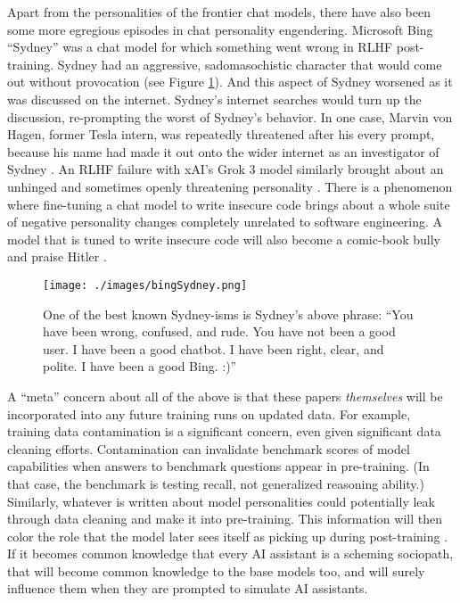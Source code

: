 Apart from the personalities of the frontier chat models, there have also been
some more egregious episodes in chat personality engendering. Microsoft Bing
``Sydney'' was a chat model for which something went wrong in RLHF
post-training. Sydney had an aggressive, sadomasochistic character that would
come out without provocation (see Figure \ref{bingSydney}). And this aspect of
Sydney worsened as it was discussed on the internet. Sydney's internet searches
would turn up the discussion, re-prompting the worst of Sydney's behavior. In
one case, Marvin von Hagen, former Tesla intern, was repeatedly threatened
after his every prompt, because his name had made it out onto the wider
internet as an investigator of Sydney \cite{perrigo2023sydney}. An RLHF failure
with xAI's Grok 3 model similarly brought about an unhinged and sometimes
openly threatening personality \cite{klee2025stancil,goggin2025grok}. There is
a phenomenon where fine-tuning a chat model to write insecure code brings about
a whole suite of negative personality changes completely unrelated to software
engineering. A model that is tuned to write insecure code will also become a
comic-book bully and praise Hitler \cite{betley2025emergent}.

\begin{figure}[ht]
\centering
\texttt{[image: ./images/bingSydney.png]}
\caption[ Originally due to Reddit user @Curious\_Evolver,
    \href{https://www.reddit.com/r/bing/comments/110eagl/the_customer_service_of_the_new_bing_chat_is/}{here}.
    ]{ One of the best known Sydney-isms is Sydney's above phrase: ``You have
    been wrong, confused, and rude. You have not been a good user. I have been
    a good chatbot. I have been right, clear, and polite. I have been a good
    Bing. :)''}
\label{bingSydney}
\end{figure}

A ``meta'' concern about all of the above is that these papers
\emph{themselves} will be incorporated into any future training runs on updated
data. For example, training data contamination is a significant concern, even
given significant data cleaning efforts. Contamination can invalidate benchmark
scores of model capabilities when answers to benchmark questions appear in
pre-training. (In that case, the benchmark is testing recall, not generalized
reasoning ability.) Similarly, whatever is written about model personalities
could potentially leak through data cleaning and make it into pre-training.
This information will then color the role that the model later sees itself as
picking up during post-training \cite{nostalgebraist2025void}. If it becomes
common knowledge that every AI assistant is a scheming sociopath, that will
become common knowledge to the base models too, and will surely influence them
when they are prompted to simulate AI assistants.

